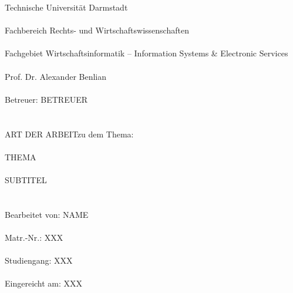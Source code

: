 %
%
%
%

\singlespacing 
\noindent Technische Universität Darmstadt \\\\
Fachbereich Rechts- und Wirtschaftswissenschaften \\\\
Fachgebiet Wirtschaftsinformatik -- Information Systems \& Electronic Services \\\\
Prof. Dr. Alexander Benlian \\\\
Betreuer: BETREUER \\\\
\\
\lbrack ART DER ARBEIT\rbrack zu dem Thema: \\\\
\lbrack THEMA\rbrack \\\\
\lbrack SUBTITEL\rbrack \\\\
\\
Bearbeitet von: \lbrack NAME\rbrack \\\\
Matr.-Nr.: \lbrack XXX\rbrack \\\\
Studiengang: \lbrack XXX\rbrack \\\\
Eingereicht am: \lbrack XXX\rbrack \\\\

\onehalfspacing

\setcounter{page}{2}